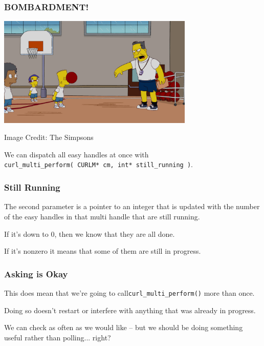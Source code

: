 \begin{frame}
\frametitle{BOMBARDMENT!}
\begin{center}
	\includegraphics[width=0.7\textwidth]{images/Bombardment.png}
\end{center}
\hfill Image Credit: The Simpsons

We can dispatch all easy handles at once with\\
 \texttt{curl\_multi\_perform( CURLM* cm, int* still\_running )}.


\end{frame}

\begin{frame}
\frametitle{Still Running}

 The second parameter is a pointer to an integer that is updated with the number of the easy handles in that multi handle that are still running. 
 
 If it's down to 0, then we know that they are all done. 
 
 If it's nonzero it means that some of them are still in progress.


\end{frame}

\begin{frame}
\frametitle{Asking is Okay}

This does mean that we're going to call\texttt{curl\_multi\_perform()} more than once. 

Doing so doesn't restart or interfere with anything that was already in progress.

We can check as often as we would like -- but we should be doing something useful rather than polling... right?

\end{frame}



